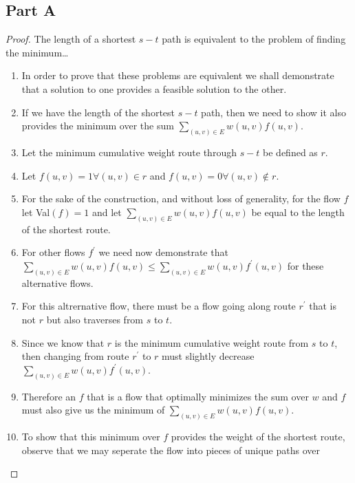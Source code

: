 \documentclass{article}
\begin{document}
\subsection{Part A}
\begin{proof} The length of a shortest \(s-t\) path is equivalent to the problem of
finding the minimum\dots
      \begin{enumerate}
            \item In order to prove that these problems are equivalent we shall
            demonstrate that a solution to one provides a feasible solution to the other. 
            \item If we have the length of the shortest \(s-t\) path, then we need to show
            it also provides the minimum over the sum  \(\sum_{(u,v) \in E} w(u,v)
            f(u,v)\). 
            \item Let the minimum cumulative weight route through \(s-t\) be defined as
            \(r\). 
            \item Let \(f(u,v) = 1 \forall (u,v) \in r\) and \(f(u,v) = 0 \forall (u,v)
            \notin r\). 
            \item For the sake of the construction, and without loss of generality, for
            the flow \(f\) let
            Val\((f) = 1\) and let \(\sum_{(u,v) \in E} w(u,v)f(u,v)\) be equal to the
            length of the shortest route. 
            \item For other flows \(f^{\prime}\) we need now demonstrate that
            \(\sum_{(u,v)\in E}w(u,v)f(u,v) \leq \sum_{(u,v)\in E}w(u,v)f^{\prime}(u,v)\)
            for these alternative flows. 
            \item For this altrernative flow, there must be a flow going along route
            \(r^{\prime}\) that is not \(r\) but also traverses from \(s\) to \(t\). 
            \item Since we know that \(r\) is the minimum cumulative weight route from
            \(s\) to \(t\), then changing from route \(r^{\prime}\) to \(r\) must slightly
            decrease \(\sum_{(u,v) \in E} w(u,v) f^{\prime} (u,v)\). 
            \item Therefore an \(f\) that is a flow that optimally minimizes the sum over
            \(w\) and \(f\) must also give us the minimum of \(\sum_{(u,v) \in E} w(u,v) f
            (u,v)\).
            \item To show that this minimum over \(f\) provides the weight of the shortest
            route, observe that we may seperate the flow into pieces of unique paths over

\end{enumerate}
\end{proof}
\end{document}
